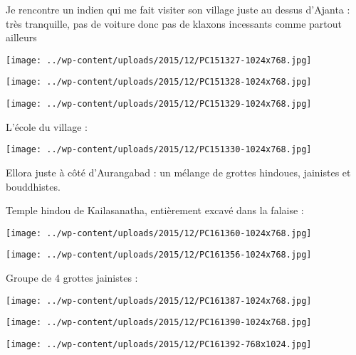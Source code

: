 Je rencontre un indien qui me fait visiter son village juste au dessus d'Ajanta : très tranquille, pas de voiture donc pas de klaxons incessants comme partout ailleurs 
\begin{center} \texttt{[image: ../wp-content/uploads/2015/12/PC151327-1024x768.jpg]} \end{center}
\begin{center} \texttt{[image: ../wp-content/uploads/2015/12/PC151328-1024x768.jpg]} \end{center}
\begin{center} \texttt{[image: ../wp-content/uploads/2015/12/PC151329-1024x768.jpg]} \end{center}

L'école du village :
\begin{center} \texttt{[image: ../wp-content/uploads/2015/12/PC151330-1024x768.jpg]} \end{center}
\pagebreak

Ellora juste à côté d'Aurangabad : un mélange de grottes hindoues, jainistes et bouddhistes. 

Temple hindou de Kailasanatha, entièrement excavé dans la falaise : 
\begin{center} \texttt{[image: ../wp-content/uploads/2015/12/PC161360-1024x768.jpg]} \end{center}
\begin{center} \texttt{[image: ../wp-content/uploads/2015/12/PC161356-1024x768.jpg]} \end{center}
\pagebreak

Groupe de 4 grottes jainistes : 
\begin{center} \texttt{[image: ../wp-content/uploads/2015/12/PC161387-1024x768.jpg]} \end{center}
\begin{center} \texttt{[image: ../wp-content/uploads/2015/12/PC161390-1024x768.jpg]} \end{center}
\begin{center} \texttt{[image: ../wp-content/uploads/2015/12/PC161392-768x1024.jpg]} \end{center}

